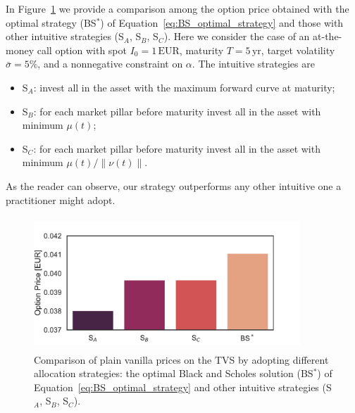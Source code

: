 \documentclass[11pt]{article}
\begin{document}
In Figure~\ref{fig:strategy_price_comparison} we provide a comparison among the option price obtained with the optimal strategy (BS$^*$) of Equation~\eqref{eq:BS_optimal_strategy} and those with other intuitive strategies (S$_A$, S$_B$, S$_C$). Here we consider the case of an at-the-money call option with spot $I_0 = 1\, \text{EUR}$, maturity $T=5 \, \text{yr}$, target volatility $\bar{\sigma}=5\%$, and a nonnegative constraint on $\alpha$. The intuitive strategies are
\begin{itemize}
\item S$_A$: invest all in the asset with the maximum forward curve at maturity;
\item S$_B$: for each market pillar before maturity invest all in the asset with minimum $\mu(t)$; 
\item S$_C$: for each market pillar before maturity invest all in the asset with minimum $\mu(t)/\|\nu(t)\|$.
\end{itemize}
As the reader can observe, our strategy outperforms any other intuitive one a practitioner might adopt.\begin{figure}[t]
	\centering
	\includegraphics[height=5cm,width=10cm]{strategy_price_comparison.pdf}
	\caption{Comparison of plain vanilla prices on the TVS by adopting different allocation strategies: the optimal Black and Scholes solution (BS$^*$) of Equation~\eqref{eq:BS_optimal_strategy} and other intuitive strategies (S$_A$, S$_B$, S$_C$).}
	\label{fig:strategy_price_comparison}
\end{figure} 
\end{document}
